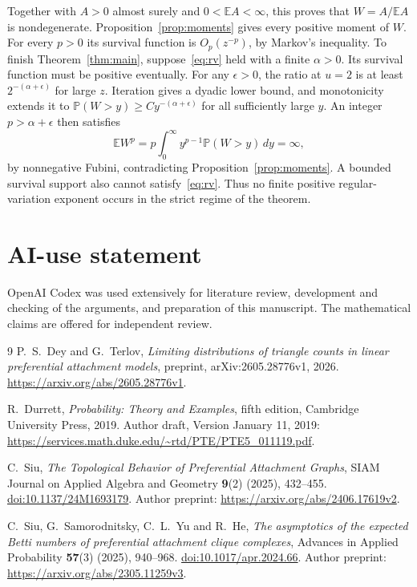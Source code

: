 \documentclass[11pt]{article}
\theoremstyle{remark}\newtheorem{remark}[theorem]{Remark}
\newcommand{\E}{\mathbb E}
\newcommand{\Prob}{\mathbb P}
\begin{document}
Together with $A>0$ almost surely and $0<\E A<\infty$, this proves that
$W=A/\E A$ is nondegenerate.
Proposition~\ref{prop:moments} gives every positive moment of $W$.
For every $p>0$ its survival function is $O_p(z^{-p})$, by Markov's
inequality. To finish Theorem~\ref{thm:main}, suppose~\eqref{eq:rv} held
with a finite $\alpha>0$. Its survival function must be positive
eventually. For any $\epsilon>0$, the ratio at $u=2$ is at least
$2^{-(\alpha+\epsilon)}$ for large $z$. Iteration gives a dyadic lower
bound, and monotonicity extends it to
$\Prob(W>y)\ge C y^{-(\alpha+\epsilon)}$ for all sufficiently large $y$.
An integer $p>\alpha+\epsilon$ then satisfies
\[
 \E W^p=p\int_0^\infty y^{p-1}\Prob(W>y)\,dy=\infty,
\]
by nonnegative Fubini, contradicting Proposition~\ref{prop:moments}.
A bounded survival support also cannot satisfy~\eqref{eq:rv}.
Thus no finite positive regular-variation exponent occurs in the strict
regime of the theorem.

\section*{AI-use statement}
OpenAI Codex was used extensively for literature review, development and
checking of the arguments, and preparation of this manuscript. The
mathematical claims are offered for independent review.

\begin{thebibliography}{9}
P.~S.~Dey and G.~Terlov,
\emph{Limiting distributions of triangle counts in linear preferential attachment models},
preprint, arXiv:2605.28776v1, 2026.
\url{https://arxiv.org/abs/2605.28776v1}.

R.~Durrett, \emph{Probability: Theory and Examples}, fifth edition,
Cambridge University Press, 2019.
Author draft, Version January 11, 2019:
\url{https://services.math.duke.edu/~rtd/PTE/PTE5_011119.pdf}.

C.~Siu, \emph{The Topological Behavior of Preferential Attachment Graphs},
SIAM Journal on Applied Algebra and Geometry \textbf{9}(2) (2025), 432--455.
\href{https://doi.org/10.1137/24M1693179}{doi:10.1137/24M1693179}.
Author preprint: \url{https://arxiv.org/abs/2406.17619v2}.

C.~Siu, G.~Samorodnitsky, C.~L.~Yu and R.~He,
\emph{The asymptotics of the expected Betti numbers of preferential attachment clique complexes},
Advances in Applied Probability \textbf{57}(3) (2025), 940--968.
\href{https://doi.org/10.1017/apr.2024.66}{doi:10.1017/apr.2024.66}.
Author preprint: \url{https://arxiv.org/abs/2305.11259v3}.
\end{thebibliography}
\end{document}
